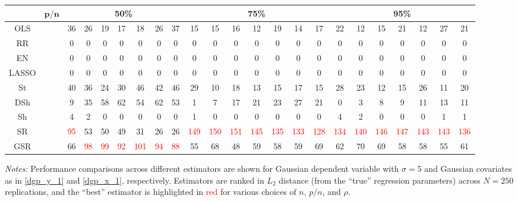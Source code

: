\begin{table}
{\begin{tabular*}{\textwidth}{@{\extracolsep{\fill}}cc|ccccccc|ccccccc|ccccccc@{}}
\hline
\multirow{2}{*}{} & $\bm{p/n}$ & \multicolumn{7}{c|}{\textbf{50\%}} & \multicolumn{7}{c|}{\textbf{75\%}} & \multicolumn{7}{c}{\textbf{95\%}} \\
\hline
OLS &  & 36 & 26 & 19 & 17 & 18 & 26 & 37 & 15 & 15 & 16 & 12 & 19 & 14 & 17 & 22 & 12 & 15 & 21 & 12 & 27 & 21 \\
RR &  & 0 & 0 & 0 & 0 & 0 & 0 & 0 & 0 & 0 & 0 & 0 & 0 & 0 & 0 & 0 & 0 & 0 & 0 & 0 & 0 & 0 \\
EN &  & 0 & 0 & 0 & 0 & 0 & 0 & 0 & 0 & 0 & 0 & 0 & 0 & 0 & 0 & 0 & 0 & 0 & 0 & 0 & 0 & 0 \\
LASSO &  & 0 & 0 & 0 & 0 & 0 & 0 & 0 & 0 & 0 & 0 & 0 & 0 & 0 & 0 & 0 & 0 & 0 & 0 & 0 & 0 & 0 \\
St &  & 40 & 36 & 24 & 30 & 46 & 42 & 46 & 29 & 10 & 18 & 13 & 15 & 17 & 15 & 28 & 23 & 12 & 15 & 26 & 11 & 20 \\
DSh &  & 9 & 35 & 58 & 62 & 54 & 62 & 53 & 1 & 7 & 17 & 21 & 23 & 27 & 21 & 0 & 3 & 8 & 9 & 11 & 13 & 11 \\
Sh &  & 4 & 2 & 0 & 0 & 0 & 0 & 0 & 1 & 0 & 0 & 0 & 0 & 0 & 0 & 4 & 2 & 0 & 0 & 0 & 1 & 1 \\
SR &  & \textcolor{red}{95} & 53 & 50 & 49 & 31 & 26 & 26 & \textcolor{red}{149} & \textcolor{red}{150} & \textcolor{red}{151} & \textcolor{red}{145} & \textcolor{red}{135} & \textcolor{red}{133} & \textcolor{red}{128} & \textcolor{red}{134} & \textcolor{red}{140} & \textcolor{red}{146} & \textcolor{red}{147} & \textcolor{red}{143} & \textcolor{red}{143} & \textcolor{red}{136} \\
GSR &  & 66 & \textcolor{red}{98} & \textcolor{red}{99} & \textcolor{red}{92} & \textcolor{red}{101} & \textcolor{red}{94} & \textcolor{red}{88} & 55 & 68 & 48 & 59 & 58 & 59 & 69 & 62 & 70 & 69 & 58 & 58 & 55 & 61 \\
\hline
\end{tabular*}%
}
\begin{tablenotes}[flushleft]
\footnotesize
\item \emph{Notes:} Performance comparisons across different estimators are shown for Gaussian dependent variable with $\sigma=5$ and Gaussian covariates as in \eqref{dgp_y_1} and \eqref{dgp_x_1}, respectively. Estimators are ranked in $L_2$ distance (from the ``true'' regression parameters) across $N = 250$ replications, and the ``best'' estimator is highlighted in \textcolor{red}{red} for various choices of $n$, $p/n$, and $\rho$.
\end{tablenotes}
\end{table}
